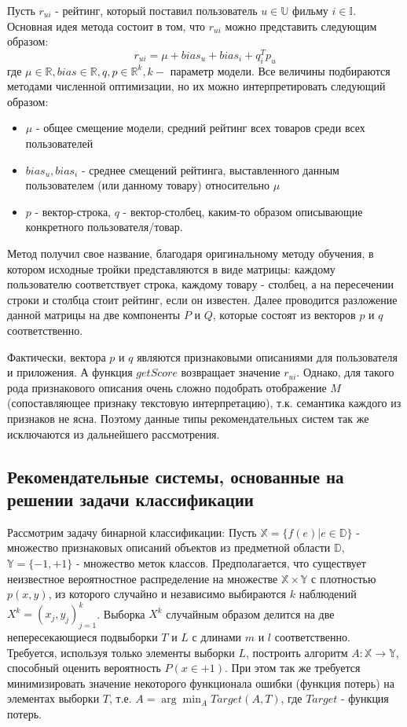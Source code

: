 \documentclass[12pt,a4paper]{report}
\begin{document}
Пусть $r_{ui}$ - рейтинг, который поставил пользователь $u \in \mathbb{U}$ фильму $i \in \mathbb{I}$. Основная идея метода состоит в том, что $r_{ui}$ можно представить следующим образом:
\begin{equation*}
r_{ui} = \mu + bias_{u} + bias_{i} + q_{i}^Tp_{u}
\end{equation*}
где $\mu \in \mathbb{R}, bias \in \mathbb{R}, q,p \in \mathbb{R}^k, k - $ параметр модели.
Все величины подбираются методами численной оптимизации, но их можно интерпретировать следующий образом:
\begin{itemize}
\item $\mu$ - общее смещение модели, средний рейтинг всех товаров среди всех пользователей
\item $bias_u, bias_i$ - среднее смещений рейтинга, выставленного данным пользователем (или данному товару) относительно $\mu$
\item $p$ - вектор-строка, $q$ - вектор-столбец, каким-то образом описывающие конкретного пользователя/товар.
\end{itemize}

Метод получил свое название, благодаря оригинальному методу обучения, в котором  исходные тройки представляются в виде матрицы: каждому пользователю соответствует строка, каждому товару - столбец, а на пересечении строки и столбца стоит рейтинг, если он известен. Далее проводится разложение данной матрицы на две компоненты $P$ и $Q$, которые состоят из векторов $p$ и $q$ соответственно.

Фактически, вектора $p$ и $q$ являются признаковыми описаниями для пользователя и приложения. А функция $getScore$ возвращает значение $r_{ui}$. Однако, для такого рода признакового описания очень сложно подобрать отображение $M$ (сопоставляющее признаку текстовую интерпретацию), т.к. семантика каждого из признаков не ясна. Поэтому данные типы рекомендательных систем так же исключаются из дальнейшего рассмотрения.
\subsection{Рекомендательные системы, основанные на решении задачи классификации}

Рассмотрим задачу бинарной классификации:
Пусть $\mathbb{X} = \{f(e) | e \in \mathbb{D}\}$ - множество признаковых описаний объектов из предметной области $\mathbb{D}$, $\mathbb{Y} = \{-1, +1\}$ - множество меток классов. Предполагается, что существует неизвестное вероятностное распределение на множестве $\mathbb{X} \times \mathbb{Y}$ с плотностью $p(x, y)$, из которого случайно и независимо выбираются $k$ наблюдений $X^k = (x_j, y_j)_{j=1}^k	$. Выборка $X^k$ случайным образом делится на две непересекающиеся подвыборки $T$ и $L$ с длинами $m$ и $l$ соответственно. Требуется, используя только элементы выборки $L$, построить алгоритм $A:\mathbb{X} \to \mathbb{Y}$, способный оценить вероятность $P(x \in +1)$. При этом так же требуется минимизировать значение некоторого функционала ошибки (функция потерь) на элементах выборки $T$, т.е. $A = \arg \min_{A}Target(A, T)$, где $Target$ - функция потерь.
\end{document}
